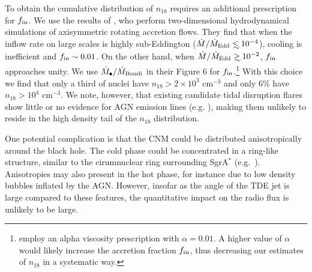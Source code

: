 \documentclass[usenatbib,fleqn]{mnras}
\newcommand\lsim{\mathrel{\rlap{\lower4pt\hbox{\hskip1pt$\sim$}}
    \raise1pt\hbox{$<$}}}
\newcommand\gsim{\mathrel{\rlap{\lower4pt\hbox{\hskip1pt$\sim$}}
    \raise1pt\hbox{$>$}}}
\begin{document}
To obtain the cumulative distribution of $n_{18}$ requires an
additional prescription for $f_{\rm in}$.  We use the results of
\citet{Li+2013}, who perform two-dimensional hydrodynamical
simulations of axisymmetric rotating accretion flows.  They find that
when the inflow rate on large scales is highly sub-Eddington
($\dot{M}/\dot{M}_{\rm Edd} \lsim 10^{-4}$), cooling is inefficient
and $f_{\rm in}\sim 0.01$. On the other hand, when
$\dot{M}/\dot{M}_{\rm Edd}\gsim 10^{-2}$, $f_{\rm in}$ approaches
unity.  We use $\dot{M}_{\bullet}/\dot{M}_{\rm Bondi}$ in their Figure
6 for $f_{\rm in}$.\footnote{\citet{Li+2013} employ an alpha viscosity
  prescription with $\alpha=0.01$.  A higher value of $\alpha$ would
  likely increase the accretion fraction $f_{\rm in}$, thus decreasing
  our estimates of $n_{18}$ in a systematic way.}  With this choice we
find that only a third of nuclei have $n_{18}>2\times 10^{3}$
cm$^{-3}$ and only 6\% have $n_{18}>10^{4}$ cm$^{-3}$.  We note,
however, that existing candidate tidal disruption flares show little
or no evidence for AGN emission lines (e.g. \citealt{van-Velzen+2011,
  Arcavi+2014}), making them unlikely to reside in the high density
tail of the $n_{18}$ distribution.

One potential complication is that the CNM could be distributed
anisotropically around the black hole.  The cold phase could be
concentrated in a ring-like structure, similar to the cirumnuclear
ring surrounding SgrA$^{*}$ (e.g.~\citealt{Lau+13}).  Anisotropies may
also present in the hot phase, for instance due to low density bubbles
inflated by the AGN.  However, insofar as the angle of the TDE jet is
large compared to these features, the quantitative impact on the radio
flux is unlikely to be large.

\end{document}
